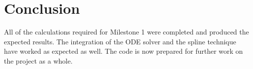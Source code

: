 \documentclass[a4paper]{article}
\begin{document}

\section{Conclusion}\label{sec:conc}
All of the calculations required for Milestone 1 were completed and produced the expected results. The integration of the ODE solver and the spline technique have worked as expected as well. The code is now prepared for further work on the project as a whole.

\end{document}
